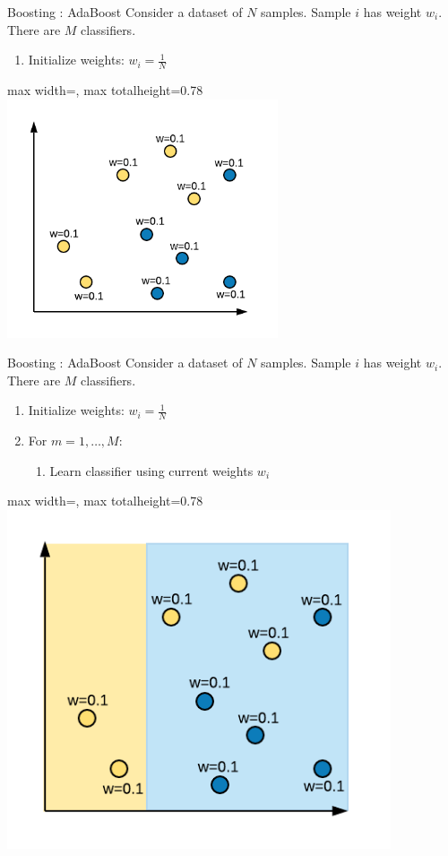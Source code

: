 \documentclass[aspectratio=169,10pt]{beamer}
\newcommand{\fitpic}[1]{\begin{adjustbox}{max width=\linewidth, max totalheight=0.78\textheight}#1\end{adjustbox}}
\begin{document}
\begin{frame}{Boosting : AdaBoost }
  Consider a dataset of $N$ samples. Sample $i$ has weight $w_i$. There are $M$ classifiers.\\[0.3cm]
  \begin{enumerate}
    \item Initialize weights: $w_i = \frac{1}{N}$
  \end{enumerate}
  \centering
  \fitpic{\includegraphics[width=0.6\textwidth]{../assets/ensemble/diagrams/ada_data_init_weights}}
\end{frame}

\begin{frame}{Boosting : AdaBoost }
  Consider a dataset of $N$ samples. Sample $i$ has weight $w_i$. There are $M$ classifiers.\\[0.3cm]
  \begin{enumerate}
    \item Initialize weights: $w_i = \frac{1}{N}$
    \item For $m = 1, \ldots, M$:
          \begin{enumerate}
            \item Learn classifier using current weights $w_i$
          \end{enumerate}
  \end{enumerate}
  \centering
  \fitpic{\includegraphics[width=0.85\textwidth]{../assets/ensemble/diagrams/ada_iter1}}
\end{frame}
\end{document}
